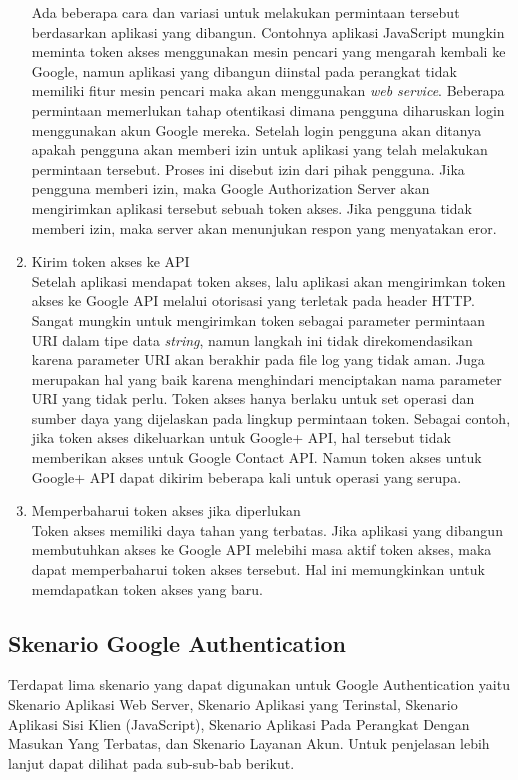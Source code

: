 \begin{enumerate}
Ada beberapa cara dan variasi untuk melakukan permintaan tersebut berdasarkan aplikasi yang dibangun. Contohnya aplikasi JavaScript mungkin meminta token akses menggunakan mesin pencari yang mengarah kembali ke Google, namun aplikasi yang dibangun diinstal pada perangkat tidak memiliki fitur mesin pencari maka akan menggunakan {\it web service}. Beberapa permintaan memerlukan tahap otentikasi dimana pengguna diharuskan login menggunakan akun Google mereka. Setelah login pengguna akan ditanya apakah pengguna akan memberi izin untuk aplikasi yang telah melakukan permintaan tersebut. Proses ini disebut izin dari pihak pengguna. Jika pengguna memberi izin, maka Google Authorization Server akan mengirimkan aplikasi tersebut sebuah token akses. Jika pengguna tidak memberi izin, maka server akan menunjukan respon yang menyatakan eror.
\item
Kirim token akses ke API\\
Setelah aplikasi mendapat token akses, lalu aplikasi akan mengirimkan token akses ke Google API melalui otorisasi yang terletak pada header HTTP. Sangat mungkin untuk mengirimkan token sebagai parameter permintaan URI dalam tipe data {\it string}, namun langkah ini tidak direkomendasikan karena parameter URI akan berakhir pada file log yang tidak aman. Juga merupakan hal yang baik karena menghindari menciptakan nama parameter URI yang tidak perlu.
Token akses hanya berlaku untuk set operasi dan sumber daya yang dijelaskan pada lingkup permintaan token. Sebagai contoh, jika token akses dikeluarkan untuk Google+ API, hal tersebut tidak memberikan akses untuk Google Contact API. Namun token akses untuk Google+ API dapat dikirim beberapa kali untuk operasi yang serupa.
\item
Memperbaharui token akses jika diperlukan\\
Token akses memiliki daya tahan yang terbatas. Jika aplikasi yang dibangun membutuhkan akses ke Google API melebihi masa aktif token akses, maka dapat memperbaharui token akses tersebut. Hal ini memungkinkan untuk memdapatkan token akses yang baru.
\end{enumerate}

\subsection{Skenario Google Authentication}
Terdapat lima skenario yang dapat digunakan untuk Google Authentication yaitu Skenario Aplikasi Web Server, Skenario Aplikasi yang Terinstal, Skenario Aplikasi Sisi Klien (JavaScript), Skenario Aplikasi Pada Perangkat Dengan Masukan Yang Terbatas, dan Skenario Layanan Akun. Untuk penjelasan lebih lanjut dapat dilihat pada sub-sub-bab berikut.

